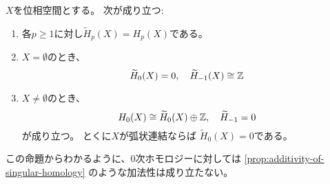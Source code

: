\documentclass[report]{jlreq}
\begin{document}
\begin{proposition}
    $X$を位相空間とする。
    次が成り立つ:
    \begin{enumerate}
        \item 各$p \ge 1$に対し$\widetilde{H}_p(X) = H_p(X)$である。
        \item $X = \emptyset$のとき、
            \begin{equation}
                \widetilde{H}_0(X) = 0,
                \quad
                \widetilde{H}_{-1}(X) \cong \mathbb{Z}
            \end{equation}
        \item $X \neq \emptyset$のとき、
            \begin{equation}
                H_0(X) \cong \widetilde{H}_0(X) \oplus \mathbb{Z},
                \quad
                \widetilde{H}_{-1} = 0
            \end{equation}
            が成り立つ。
            とくに$X$が弧状連結ならば
            $\widetilde{H}_0(X) = 0$である。
    \end{enumerate}
\end{proposition}

\begin{remark}
    この命題からわかるように、0次ホモロジーに対しては
    \cref{prop:additivity-of-singular-homology} のような加法性は成り立たない。
\end{remark}
\end{document}
